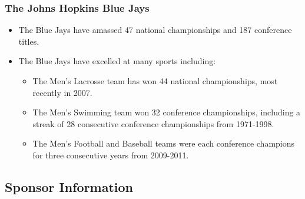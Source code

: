 \documentclass[compress,handout,10pt]{beamer}
\let\olditem\item
\renewcommand{\item}{\setlength{\itemsep}{0.5\baselineskip}\olditem}
\begin{document}
\begin{frame}
	\frametitle{The Johns Hopkins Blue Jays}
		\begin{itemize}
			\item The Blue Jays have amassed 47 national championships and 187 conference titles.\cite{hopathletic}
			\item The Blue Jays have excelled at many sports including:
			\begin{itemize}
				\item The Men's Lacrosse team has won 44 national championships, most recently in 2007.\cite{hopathletic}
				\item The Men's Swimming team won 32 conference championships, including a streak of 28 consecutive conference championships from 1971-1998.\cite{hopathletic}
				\item The Men's Football and Baseball teams were each conference champions for three consecutive years from 2009-2011. \cite{hopathletic}
		\end{itemize}
	\end{itemize}
\end{frame}

\subsection{Sponsor Information}
\end{document}
